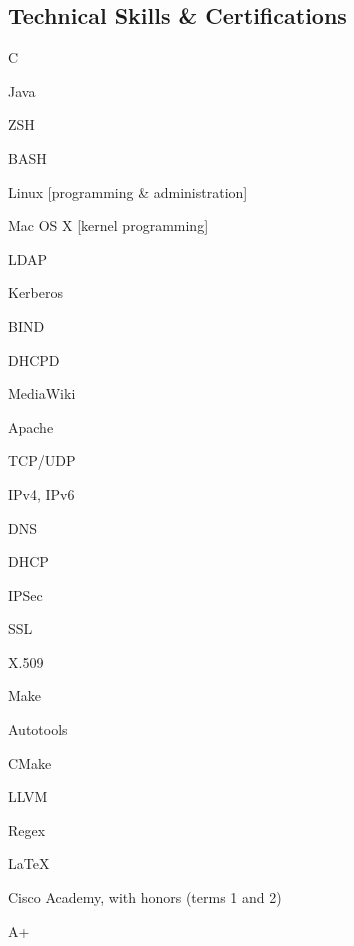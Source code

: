 \documentclass[a4paper,margin,line]{resume}
\begin{document}
\begin{resume}
\section{\mysidestyle Technical Skills \& Certifications}
	\begin{compactdesc}
		\item[Fluent Languages] \begin{inparaenum} { \small
			\item C
			\item Java
			\item ZSH
			\item BASH
		} \end{inparaenum}
		\item[Operating Systems] \begin{inparaenum} { \small
			\item Linux [programming \& administration]
			\item Mac OS X [kernel programming]
		} \end{inparaenum}
		\item[Server Administration] \begin{inparaenum} { \small
			\item LDAP
			\item Kerberos
			\item BIND
			\item DHCPD
			\item MediaWiki
			\item Apache
		} \end{inparaenum}
		\item[Networking] \begin{inparaenum} { \small
			\item TCP/UDP
			\item IPv4, IPv6
			\item DNS
			\item DHCP
			\item IPSec
			\item SSL
			\item X.509
		} \end{inparaenum}
		\item[Tools] \begin{inparaenum} { \small
			\item Make
			\item Autotools
			\item CMake
			\item LLVM
			\item Regex
			\item \LaTeX
		} \end{inparaenum}
		\item[Certifications] \begin{inparaenum} { \small
			\item Cisco Academy, with honors (terms 1 and 2)
			\item A+
		} \end{inparaenum}
	\end{compactdesc}


\end{resume}
\end{document}
